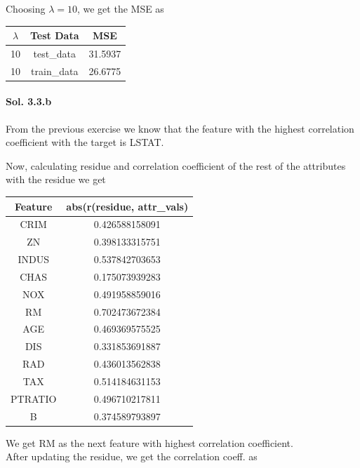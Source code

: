 \documentclass[]{report}
\begin{document}
	  	Choosing $\lambda = 10$, we get the MSE as 
	  	
		\begin{center}
	    \begin{tabular}{c|c|c}
			\hline
			   $\lambda$ & Test Data    &     MSE \\
			\hline
			     10 & test\_data  & 31.5937  \\
			     10 & train\_data & 26.6775 \\
			\hline
		\end{tabular}
	    \end{center}

	\paragraph{Sol. 3.3.b}
	    From the previous exercise we know that the feature with the highest correlation coefficient with the target is LSTAT.

	    Now, calculating residue and correlation coefficient of the rest of the attributes with the residue we get

	    \begin{center}
	    \begin{tabular}{c|c}
			\hline
			 Feature & abs(r(residue, attr\_vals)  \\
			\hline
			 CRIM    & 0.426588158091 \\
			 ZN      & 0.398133315751 \\
			 INDUS   & 0.537842703653 \\
			 CHAS    & 0.175073939283 \\
			 NOX     & 0.491958859016 \\
			 RM      & 0.702473672384 \\
			 AGE     & 0.469369575525 \\
			 DIS     & 0.331853691887 \\
			 RAD     & 0.436013562838 \\
			 TAX     & 0.514184631153 \\
			 PTRATIO & 0.496710217811 \\
			 B       & 0.374589793897 \\
			\hline
			\end{tabular}
	    \end{center}

	    We get RM as the next feature with highest correlation coefficient. \\

	    After updating the residue, we get the correlation coeff. as
\end{document}
